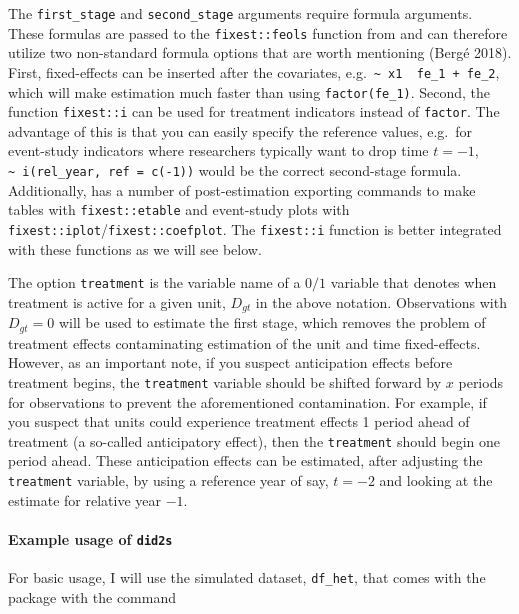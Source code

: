 The \texttt{first\_stage} and \texttt{second\_stage} arguments require formula arguments. These formulas are passed to the \texttt{fixest::feols} function from  and can therefore utilize two non-standard formula options that are worth mentioning (Bergé 2018). First, fixed-effects can be inserted after the covariates, e.g.~\texttt{\textasciitilde{}\ x1\ \textbar{}\ fe\_1\ +\ fe\_2}, which will make estimation much faster than using \texttt{factor(fe\_1)}. Second, the function \texttt{fixest::i} can be used for treatment indicators instead of \texttt{factor}. The advantage of this is that you can easily specify the reference values, e.g.~for event-study indicators where researchers typically want to drop time \(t = -1\), \texttt{\textasciitilde{}\ i(rel\_year,\ ref\ =\ c(-1))} would be the correct second-stage formula. Additionally,  has a number of post-estimation exporting commands to make tables with \texttt{fixest::etable} and event-study plots with \texttt{fixest::iplot}/\texttt{fixest::coefplot}. The \texttt{fixest::i} function is better integrated with these functions as we will see below.

The option \texttt{treatment} is the variable name of a \(0/1\) variable that denotes when treatment is active for a given unit, \(D_{gt}\) in the above notation. Observations with \(D_{gt} = 0\) will be used to estimate the first stage, which removes the problem of treatment effects contaminating estimation of the unit and time fixed-effects. However, as an important note, if you suspect anticipation effects before treatment begins, the \texttt{treatment} variable should be shifted forward by \(x\) periods for observations to prevent the aforementioned contamination. For example, if you suspect that units could experience treatment effects 1 period ahead of treatment (a so-called anticipatory effect), then the \texttt{treatment} should begin one period ahead. These anticipation effects can be estimated, after adjusting the \texttt{treatment} variable, by using a reference year of say, \(t = -2\) and looking at the estimate for relative year \(-1\).

\hypertarget{example-usage-of-did2s}{%
\paragraph{\texorpdfstring{Example usage of \texttt{did2s}}{Example usage of did2s}}\label{example-usage-of-did2s}}

For basic usage, I will use the simulated dataset, \texttt{df\_het}, that comes with the  package with the command

